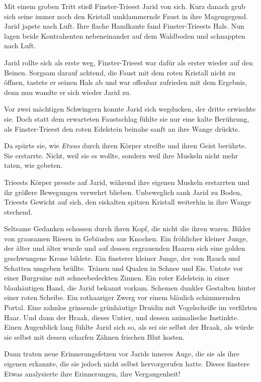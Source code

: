 Mit einem groben Tritt stieß Finster-Trieest Jarid von sich. Kurz danach grub sich seine immer noch den Kristall umklammernde Faust in ihre Magengegend. Jarid japste nach Luft. Ihre flache Handkante fand Finster-Trieests Hals. Nun lagen beide Kontrahenten nebeneinander auf dem Waldboden und schnappten nach Luft.

Jarid rollte sich als erste weg, Finster-Trieest war dafür als erster wieder auf den Beinen. Sorgsam darauf achtend, die Faust mit dem roten Kristall nicht zu öffnen, tastete er seinen Hals ab und war offenbar zufrieden mit dem Ergebnis, denn nun wandte er sich wieder Jarid zu.

Vor zwei mächtigen Schwingern konnte Jarid sich wegducken, der dritte erwischte sie. Doch statt dem erwarteten Faustschlag fühlte sie nur eine kalte Berührung, als Finster-Trieest den roten Edelstein beinahe sanft an ihre Wange drückte.

Da spürte sie, wie \textit{Etwas} durch ihren Körper streifte und ihren Geist berührte. Sie erstarrte. Nicht, weil sie es wollte, sondern weil ihre Muskeln nicht mehr taten, wie gebeten.

Trieests Körper presste auf Jarid, während ihre eigenen Muskeln erstarrten und ihr größere Bewegungen verwehrt blieben. Unbeweglich sank Jarid zu Boden, Trieests Gewicht auf sich, den eiskalten spitzen Kristall weiterhin in ihre Wange stechend.

Seltsame Gedanken schossen durch ihren Kopf, die nicht die ihren waren. Bilder von grausamen Riesen in Gebäuden aus Knochen. Ein fröhlicher kleiner Junge, der älter und älter wurde und auf dessen ergrauenden Haaren sich eine golden geschwungene Krone bildete. Ein finsterer kleiner Junge, der von Rauch und Schatten umgeben brüllte. Tränen und Qualen in Schnee und Eis. Untote vor einer Burgruine mit schneebedeckten Zinnen. Ein roter Edelstein in einer blauhäutigen Hand, die Jarid bekannt vorkam. Schemen dunkler Gestalten hinter einer roten Scheibe. Ein rothaariger Zwerg vor einem bläulich schimmernden Portal. Eine zahnlos grinsende grünhäutige Druidin mit Vogelscheiße im verfilzten Haar. Und dann der Hraak, dieses Untier, und dessen animalische Instinkte. Einen Augenblick lang fühlte Jarid sich so, als sei sie selbst der Hraak, als würde sie selbst mit dessen scharfen Zähnen frischen Blut kosten.

Dann traten neue Erinnerungsfetzen vor Jarids inneres Auge, die sie als ihre eigenen erkannte, die sie jedoch nicht selbst hervorgerufen hatte. Dieses finstere Etwas analysierte ihre Erinnerungen, ihre Vergangenheit!

